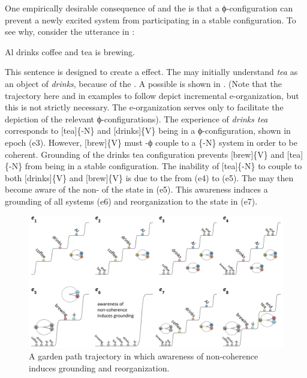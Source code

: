  One empirically desirable consequence of  and the  is that a ϕ-configuration can prevent a newly excited system from participating in a stable configuration. To see why, consider the utterance in : 

\ea\label{ex:6:12}
Al drinks coffee and tea is brewing.
\z   

  This sentence is designed to create a  effect. The  may initially understand \textit{tea} as an object of \textit{drinks}, because of the . A possible  is shown in {}. (Note that the trajectory here and in examples to follow depict incremental e-organization, but this is not strictly necessary. The e-organization serves only to facilitate the depiction of the relevant ϕ-configurations). The   experience of \textit{drinks tea} corresponds to [tea]\{-N\} and [drinks]\{V\} being in a ϕ-configuration, shown in epoch (e3).  However, [brew]\{V\} must -ϕ couple to a \{-N\} system in order to be coherent. Grounding of the {\textbar}drinks tea{\textbar} configuration prevents [brew]\{V\} and [tea]\{-N\} from being in a stable configuration. The inability of [tea]\{-N\} to couple to both [drinks]\{V\} and [brew]\{V\} is due to the  from (e4) to (e5). The  may then become aware of the non- of the state in (e5). This awareness induces a grounding of all systems (e6) and reorganization to the state in (e7). 

  
\begin{figure}
\includegraphics[width=\textwidth]{figures/Tilsen-img130.png}
\caption{A garden path trajectory in which awareness of non-coherence induces grounding and reorganization.}
\label{fig:6:11}
\end{figure}
 

